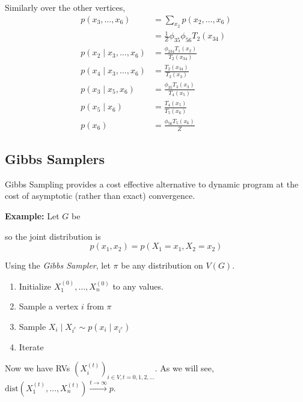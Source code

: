 \documentclass[12pt]{report}
\newcommand*{\tbf}[1]{\ifmmode\mathbf{#1}\else\textbf{#1}\fi}
\begin{document}
Similarly over the other vertices,
\begin{align*}
    p(x_3, \dots, x_6)             & = \sum_{x_2} p(x_2, \dots, x_6)               \\
                                   & = \frac{1}{Z} \phi_{35} \phi_{56} T_2(x_{34}) \\
    p(x_2 \; | \; x_3, \dots, x_6) & = \frac{\phi_{234} T_1(x_2)}{T_2(x_{34})}     \\
    p(x_4 \; | \; x_3, \dots, x_6) & = \frac{T_2(x_{34})}{T_3(x_3)}                \\
    p(x_3 \; | \; x_5, x_6)        & = \frac{\phi_{35} T_3(x_3)}{T_4(x_5)}         \\
    p(x_5\; | \; x_6)              & = \frac{T_4(x_5)}{T_5(x_6)}                   \\
    p(x_6)                         & = \frac{\phi_{56} T_5(x_6)}{Z}
\end{align*}

\subsection{Gibbs Samplers}
Gibbs Sampling provides a cost effective alternative to dynamic program at the cost of asymptotic (rather than exact) convergence.

\tbf{Example:} Let $G$ be

\begin{center}
\end{center}
so the joint distribution is
\[p(x_1, x_2) = p(X_1 = x_1, X_2 = x_2)\]

Using the\emph{ Gibbs Sampler}, let $\pi$ be any distribution on $V(G)$.
\begin{enumerate}
    \item Initialize $X_1^{(0)}, \dots, X_n^{(0)}$ to any values.
    \item Sample a vertex $i$ from $\pi$
    \item Sample $X_i \; | \; X_{i^c} \sim p(x_i \; | \; x_{i^c})$
    \item Iterate
\end{enumerate}

Now we have RVs $(X_i^{(t)})_{i \in V, t = 0, 1, 2, \dots}$. As we will see, $\text{dist}(X_1^{(t)}, \dots, X_n^{(t)}) \overset{t \to \infty}{\longrightarrow} p$.
\end{document}

